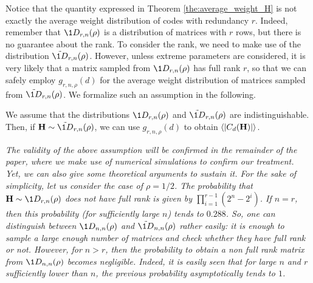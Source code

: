 Notice that the quantity expressed in Theorem \ref{the:average_weight_H} is not exactly the average weight distribution of codes with redundancy $r$.
Indeed, remember that $\1{D}_{r,n}(\rho)$ is a distribution of matrices with $r$ rows, but there is no guarantee about the rank.
To consider the rank, we need to make use of the distribution $\tilde{\1{D}}_{r,n}(\rho)$.
However, unless extreme parameters are considered, it is very likely that a matrix sampled from $\1{D}_{r,n}(\rho)$ has full rank $r$, so that we can safely employ $g_{r,n,\rho}(d)$ for the average weight distribution of matrices sampled from $\tilde{\1{D}}_{r,n}(\rho)$.
We formalize such an assumption in the following.
\begin{assumption}\label{ass:ass_rate}
We assume that the distributions $\1{D}_{r,n}(\rho)$ and $\tilde{\1{D}}_{r,n}(\rho)$ are indistinguishable. 
Then, if $\6H\sim\tilde{\1{D}}_{r,n}(\rho)$, we can use $g_{r,n,\rho}(d)$ to obtain $\langle |C_d(\mathbf H)|\rangle$.
\end{assumption}
\begin{remark}
\emph{The validity of the above assumption will be confirmed in the remainder of the paper, where we make use of numerical simulations to confirm our treatment.
Yet, we can also give some theoretical arguments to sustain it.
For the sake of simplicity, let us consider the case of $\rho = 1/2$.
The probability that $\6H\sim\1{D}_{r,n}(\rho)$ does not have full rank is given by
$\prod_{i = 1}^{r-1}(2^n-2^i)$.
If $n = r$, then this probability (for sufficiently large $n$) tends to $0.288$.
So, one can distinguish between $\1{D}_{n,n}(\rho)$ and $\tilde{\1{D}}_{n,n}(\rho)$ rather easily: it is enough to  sample a large enough number of matrices and check whether they have full rank or not.
However, for $n>r$, then the probability to obtain a non full rank matrix from $\1{D}_{n,n}(\rho)$ becomes negligible.
Indeed, it is easily seen that for large $n$ and $r$ sufficiently lower than $n$, the previous probability asymptotically tends to $1$.}
\end{remark}